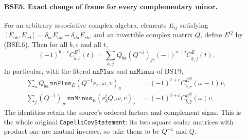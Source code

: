 \paragraph{BSE5. Exact change of frame for every complementary minor.}
\label{claim:BSE5}
For an arbitrary associative complex algebra, elements $E_{ij}$
satisfying
$[E_{ab},E_{cd}]=\delta_{bc}E_{ad}-\delta_{da}E_{cb}$,
and an invertible complex matrix $Q$, define $E^Q$ by
(BSE.6).  Then for all $b,c$ and all $t$,
\[
 (-1)^{b+c}C^{E^Q}_{\widehat b,\widehat c}(t)
 =\sum_{a,j}Q_{ba}(Q^{-1})_{jc}(-1)^{a+j}
                                      C^E_{\widehat a,\widehat j}(t).
 \tag{BSE.17}
\]
In particular, with the literal $\texttt{nnPlus}$ and
$\texttt{nnMinus}$ of BST9,
\[
 \begin{split}
 \sum_a Q_{ba}\,
       \texttt{nnPlus}_E(Q^{-1}e_c,\omega,v)_a
      &=(-1)^{b+c}C^{E^Q}_{\widehat b,\widehat c}(\omega-1)v,\\
 \sum_j(Q^{-1})_{jc}\,
       \texttt{nnMinus}_E(e_b^tQ,\omega,v)_j
      &=(-1)^{b+c}C^{E^Q}_{\widehat b,\widehat c}(\omega)v.
 \end{split}
 \tag{BSE.18}
\]
The identities retain the source's ordered factors and complement
signs.
This is the whole original \texttt{CapelliCovStatement}:
its two square scalar matrices with product one are mutual
inverses, so take them to be $Q^{-1}$ and $Q$.

